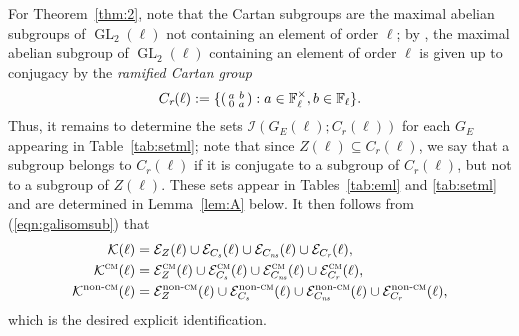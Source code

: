 \documentclass[table,dvipsnames]{amsart}
\newcommand{\F}{\mathbb{F}}
\newcommand{\GL}{\operatorname{GL}}
\newcommand{\I}{\mathcal{I}}
\newcommand{\smallmat}[4]{\begin{psmallmatrix}#1&#2\\#3&#4\end{psmallmatrix}}
\numberwithin{equation}{section}
\newcommand{\s}{\textit{s}}
\newcommand{\ns}{\textit{ns}}
\newcommand{\Cs}{C_\s}
\newcommand{\Cns}{C_\ns}
\newcommand{\Cr}{C_{\textit{r}}}
\newcommand{\CM}{\textsc{cm}}
\newcommand{\nonCM}{{\textrm{non-}\textsc{cm}}}
\begin{document}
For Theorem~\ref{thm:2}, note that the Cartan subgroups are the maximal abelian subgroups of $\GL_2(\ell)$ not containing an element of order $\ell$; by \cite[Lem.~3.3]{sutherland2016}, the maximal abelian subgroup of $\GL_2(\ell)$ containing an element of order $\ell$ is given up to conjugacy by the \emph{ramified Cartan group}
\begin{equation*}
\Cr(\ell):=\{\smallmat{a}{b}{0}{a}:a\in\F_\ell^\times,b\in\F_\ell\}.
\end{equation*}
Thus, it remains to determine the sets $\I(G_E(\ell);\Cr(\ell))$ for each $G_E$ appearing in Table~\ref{tab:setml}; note that since $Z(\ell)\subseteq \Cr(\ell)$, we say that a subgroup belongs to $\Cr(\ell)$ if it is conjugate to a subgroup of $\Cr(\ell)$, but not to a subgroup of $Z(\ell)$. These sets appear in Tables~\ref{tab:eml} and \ref{tab:setml} and are determined in Lemma~\ref{lem:A} below. It then follows from (\ref{eqn:galisomsub}) that
\begin{equation}
\label{eqn:vwl}
\begin{split}
\mathcal{K}(\ell)&=\mathcal{E}_Z(\ell)\cup\mathcal{E}_{\Cs}(\ell)\cup\mathcal{E}_{\Cns}(\ell)\cup\mathcal{E}_{\Cr}(\ell),\\
\mathcal{K}^\CM(\ell)&=\mathcal{E}_Z^\CM(\ell)\cup\mathcal{E}_{\Cs}^\CM(\ell)\cup\mathcal{E}_{\Cns}^\CM(\ell)\cup\mathcal{E}_{\Cr}^\CM(\ell),\\
\mathcal{K}^\nonCM(\ell)&=\mathcal{E}_Z^\nonCM(\ell)\cup\mathcal{E}_{\Cs}^\nonCM(\ell)\cup\mathcal{E}_{\Cns}^\nonCM(\ell)\cup\mathcal{E}_{\Cr}^\nonCM(\ell),
\end{split}
\end{equation}
which is the desired explicit identification.
\end{document}
